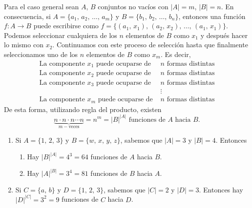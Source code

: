 \begin{BOX}
    Para el caso general sean $A$, $B$ conjuntos no vacíos con $|A| = m$, $|B| = n$. En consecuencia, si $A = \{a_1, \, a_2, \, \dots, \, a_m \}$ y $B = \{b_1, \, b_2, \, \dots, \, b_n \}$, entonces una función $f: A \longrightarrow B$ puede escribirse como $f = \{ (a_1, \, x_1), \, (a_2, \, x_2), \, \dots, \, (a_1, \, x_1) \}$. Podemos seleccionar cualquiera de los $n$ elementos de $B$ como $x_1$ y después hacer lo mismo con $x_2$. Continuamos con este proceso de selección hasta que finalmente seleccionamos uno de los $n$ elementos de $B$ como $x_m$. Es decir,
    \begin{align*}
        \text{La componente } x_1 \text{ puede ocuparse de } & n \text{ formas distintas} \\
        \text{La componente } x_2 \text{ puede ocuparse de } & n \text{ formas distintas} \\
        \text{La componente } x_3 \text{ puede ocuparse de } & n \text{ formas distintas} \\
        & \vdots \\
        \text{La componente } x_m \text{ puede ocuparse de } & n \text{ formas distintas}
    \end{align*}
    De esta forma, utilizando regla del producto, existen
    $$\underbrace{n \cdot n \cdot n \cdots n}_{m-\text{veces}} = n^m = |B|^{|A|} \text{ funciones de $A$ hacia $B$.}$$
\end{BOX}

\begin{myexamples}
    \begin{enumerate}[label=\alph*)]
        \item Si $A = \{1, \, 2, \, 3 \}$ y $B = \{w, \, x, \, y, \, z \}$, sabemos que $|A| = 3$ y $|B| = 4$. Entonces
        \begin{enumerate}[label=\roman*)]
            \item Hay $|B|^{|A|} = 4^3 = 64$ funciones de $A$ hacia $B$.
            \item Hay $|A|^{|B|} = 3^4 = 81$ funciones de $B$ hacia $A$.
        \end{enumerate}
        \item Si $C = \{a, \, b \}$ y $D = \{1, \, 2, \, 3 \}$, sabemos que $|C| = 2$ y $|D| = 3$. Entonces hay $|D|^{|C|} = 3^2 = 9$ funciones de $C$ hacia $D$.
    \end{enumerate}
\end{myexamples}


